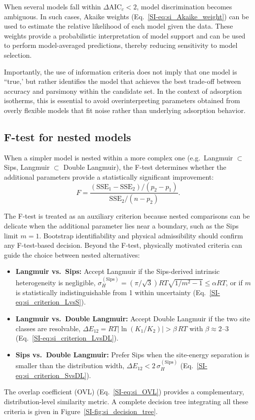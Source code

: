 \documentclass[journal=jacsat,manuscript=article]{achemso}
\begin{document}
When several models fall within $\Delta\mathrm{AIC}_c < 2$, model discrimination becomes ambiguous. In such cases, Akaike weights (Eq.~\ref{SI-eq:si_Akaike_weight}) can be used to estimate the relative likelihood of each model given the data. These weights provide a probabilistic interpretation of model support and can be used to perform model-averaged predictions, thereby reducing sensitivity to model selection.

Importantly, the use of information criteria does not imply that one model is ``true,' but rather identifies the model that achieves the best trade-off between accuracy and parsimony within the candidate set. In the context of adsorption isotherms, this is essential to avoid overinterpreting parameters obtained from overly flexible models that fit noise rather than underlying adsorption behavior.


	\subsection{F-test for nested models}
	\label{sec:Ftest}

	When a simpler model is nested within a more complex one (e.g.\ Langmuir $\subset$ Sips, Langmuir $\subset$ Double Langmuir), the F-test determines whether the additional parameters provide a statistically significant improvement:
	\begin{equation}
		F = \frac{(\mathrm{SSE}_1 - \mathrm{SSE}_2)/(p_2 - p_1)}
		{\mathrm{SSE}_2 / (n - p_2)}.
		\label{eq:Ftest}
	\end{equation}

	The F-test is treated as an auxiliary criterion because nested comparisons can be delicate when the additional parameter lies near a boundary, such as the Sips limit $m=1$. Bootstrap identifiability and physical admissibility should confirm any F-test-based decision. Beyond the F-test, physically motivated criteria can guide the choice between nested alternatives:
	\begin{itemize}
		\item \textbf{Langmuir vs.\ Sips:} Accept Langmuir if the Sips-derived intrinsic heterogeneity is negligible, $\sigma_H^{\mathrm{(Sips)}}=(\pi/\sqrt{3})RT\sqrt{1/m^2-1}\leq \alpha RT$, or if $m$ is statistically indistinguishable from 1 within uncertainty (Eq.~\ref{SI-eq:si_criterion_LvsS}).
		\item \textbf{Langmuir vs.\ Double Langmuir:} Accept Double Langmuir if the two site classes are resolvable, $\Delta E_{12} = RT|\ln(K_1/K_2)| > \beta\,RT$ with $\beta \approx 2$--$3$ (Eq.~\ref{SI-eq:si_criterion_LvsDL}).
		\item \textbf{Sips vs.\ Double Langmuir:} Prefer Sips when the site-energy separation is smaller than the distribution width, $\Delta E_{12} < 2\,\sigma_H^{\mathrm{(Sips)}}$ (Eq.~\ref{SI-eq:si_criterion_SvsDL}).
	\end{itemize}
	The overlap coefficient (OVL) (Eq.~\ref{SI-eq:si_OVL}) provides a complementary, distribution-level similarity metric. A complete decision tree integrating all these criteria is given in Figure~\ref{SI-fig:si_decision_tree}.
\end{document}

